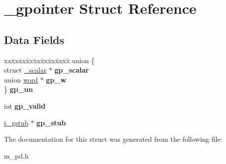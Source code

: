 \hypertarget{struct__gpointer}{}\section{\+\_\+gpointer Struct Reference}
\label{struct__gpointer}
\subsection*{Data Fields}
\begin{DoxyCompactItemize}
\item 
\mbox{\label{struct__gpointer_a0bdcbb163747bc52d28aec36e672a250}} 
\begin{tabbing}
xx\=xx\=xx\=xx\=xx\=xx\=xx\=xx\=xx\=\kill
union \{\\
\>struct \hyperlink{struct__scalar}{\_scalar} $\ast$ {\bfseries gp\_scalar}\\
\>union \hyperlink{unionword}{word} $\ast$ {\bfseries gp\_w}\\
\} {\bfseries gp\_un}\\

\end{tabbing}\item 
\mbox{\label{struct__gpointer_a8793489ee1c20be7f5e8d3475c711a0e}} 
int {\bfseries gp\+\_\+valid}
\item 
\mbox{\label{struct__gpointer_a52660c1d465beb6fc175a775b45f1c8d}} 
\hyperlink{struct__gstub}{t\+\_\+gstub} $\ast$ {\bfseries gp\+\_\+stub}
\end{DoxyCompactItemize}


The documentation for this struct was generated from the following file\+:\begin{DoxyCompactItemize}
\item 
m\+\_\+pd.\+h\end{DoxyCompactItemize}
